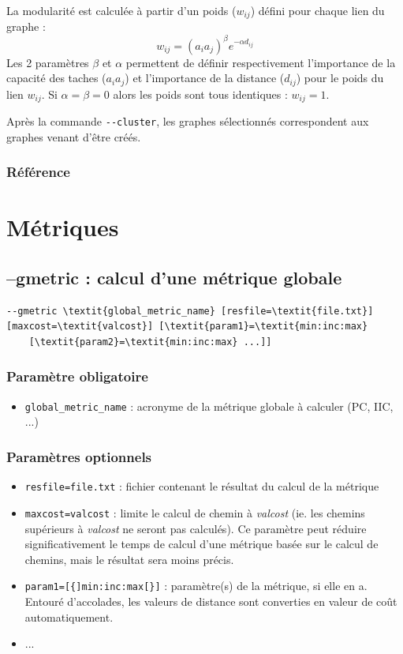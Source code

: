 \documentclass[a4paper,10pt]{report}
\begin{document}
La modularité est calculée à partir d'un poids ($w_{ij}$) défini pour chaque lien du graphe :
$$w_{ij} = (a_i a_j)^\beta e^{-\alpha d_{ij}}$$
Les 2 paramètres $\beta$ et $\alpha$ permettent de définir respectivement l'importance de la capacité des taches ($a_i a_j$) et l'importance de la distance ($d_{ij}$) pour le poids du lien $w_{ij}$. Si $\alpha = \beta = 0$ alors les poids sont tous identiques : $w_{ij} = 1$.

Après la commande \verb|--cluster|, les graphes sélectionnés correspondent aux graphes venant d'être créés.

\subsubsection{Référence}
\cite{2017_clustering}


\section{Métriques}

\subsection{--gmetric : calcul d'une métrique globale}
\begin{Verbatim}[commandchars=\\\{\}]
--gmetric \textit{global_metric_name} [resfile=\textit{file.txt}] [maxcost=\textit{valcost}] [\textit{param1}=\textit{min:inc:max}
	[\textit{param2}=\textit{min:inc:max} ...]]
\end{Verbatim}

\subsubsection{Paramètre obligatoire}
\begin{itemize}
	\item \verb|global_metric_name| : acronyme de la métrique globale à calculer (PC, IIC, ...)
\end{itemize}

\subsubsection{Paramètres optionnels}
\begin{itemize}
	\item \verb|resfile=file.txt| : fichier contenant le résultat du calcul de la métrique
	\item \verb|maxcost=valcost| : limite le calcul de chemin à \textit{valcost} (ie. les chemins supérieurs à \textit{valcost} ne seront pas calculés). Ce paramètre peut réduire significativement le temps de calcul d'une métrique basée sur le calcul de chemins, mais le résultat sera moins précis.
	\item \verb|param1=[{]min:inc:max[}]| : paramètre(s) de la métrique, si elle en a. Entouré d'accolades, les valeurs de distance sont converties en valeur de coût automatiquement.
	\item ...
\end{itemize}
\end{document}
